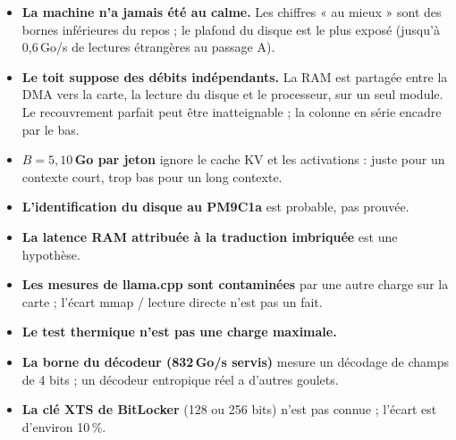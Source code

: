\begin{faux}
\begin{itemize}
\item \textbf{La machine n'a jamais été au calme.} Les chiffres « au mieux » sont des bornes inférieures du repos ; le plafond du disque est le plus exposé (jusqu'à 0,6\,Go/s de lectures étrangères au passage A).
\item \textbf{Le toit suppose des débits indépendants.} La RAM est partagée entre la DMA vers la carte, la lecture du disque et le processeur, sur un seul module. Le recouvrement parfait peut être inatteignable ; la colonne en série encadre par le bas.
\item \textbf{$B = 5{,}10$\,Go par jeton} ignore le cache KV et les activations : juste pour un contexte court, trop bas pour un long contexte.
\item \textbf{L'identification du disque au PM9C1a} est probable, pas prouvée.
\item \textbf{La latence RAM attribuée à la traduction imbriquée} est une hypothèse.
\item \textbf{Les mesures de llama.cpp sont contaminées} par une autre charge sur la carte ; l'écart mmap / lecture directe n'est pas un fait.
\item \textbf{Le test thermique n'est pas une charge maximale.}
\item \textbf{La borne du décodeur (832\,Go/s servis)} mesure un décodage de champs de 4 bits ; un décodeur entropique réel a d'autres goulets.
\item \textbf{La clé XTS de BitLocker} (128 ou 256 bits) n'est pas connue ; l'écart est d'environ 10\,\%.
\end{itemize}
\end{faux}
